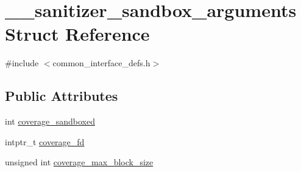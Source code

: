 \hypertarget{struct____sanitizer__sandbox__arguments}{\section{\-\_\-\-\_\-sanitizer\-\_\-sandbox\-\_\-arguments Struct Reference}
\label{struct____sanitizer__sandbox__arguments}
}


{\ttfamily \#include $<$common\-\_\-interface\-\_\-defs.\-h$>$}

\subsection*{Public Attributes}
\begin{DoxyCompactItemize}
\item 
int \hyperlink{struct____sanitizer__sandbox__arguments_a4244658f10a2c2f8b6cb14d1cc6fd770}{coverage\-\_\-sandboxed}
\item 
intptr\-\_\-t \hyperlink{struct____sanitizer__sandbox__arguments_ac8fc828482e930fa5e629eef7690081c}{coverage\-\_\-fd}
\item 
unsigned int \hyperlink{struct____sanitizer__sandbox__arguments_aa21dbbb141699e131a0eca74a4a9f199}{coverage\-\_\-max\-\_\-block\-\_\-size}
\end{DoxyCompactItemize}



